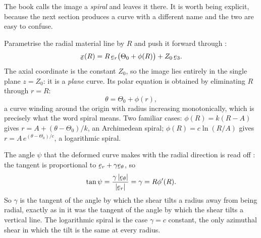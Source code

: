 \begin{remark}\label{rem:spiral}
The book calls the image a \emph{spiral} and leaves it there. It is worth
being explicit, because the next section produces a curve with a different
name and the two are easy to confuse.

Parametrise the radial material line by $R$ and push it forward through
:
\[
   \bx(R)=R\,\ber\big(\Theta_{0}+\phi(R)\big)+Z_{0}\,\be_{3}.
\]
The axial coordinate is the constant $Z_{0}$, so the image lies entirely
in the single plane $z=Z_{0}$: it is a \emph{plane} curve. Its polar
equation is obtained by eliminating $R$ through $r=R$:
\[
   \theta=\Theta_{0}+\phi(r),
\]
a curve winding around the origin with radius increasing monotonically,
which is precisely what the word spiral means. Two familiar cases:
$\phi(R)=k(R-A)$ gives $r=A+(\theta-\Theta_{0})/k$, an Archimedean
spiral; $\phi(R)=c\ln(R/A)$ gives $r=A\,e^{(\theta-\Theta_{0})/c}$, a
logarithmic spiral.

The angle $\psi$ that the deformed curve makes with the radial direction
is read off : the tangent is proportional to $\ber+\gamma\bet$, so
\[
   \tan\psi=\frac{\gamma\,|\bet|}{|\ber|}=\gamma=R\phi'(R).
\]
So $\gamma$ is the tangent of the angle by which the shear tilts a radius
away from being radial, exactly as in  it was the tangent of the
angle by which the shear tilts a vertical line. The logarithmic spiral is
the case $\gamma=c$ constant, the only azimuthal shear in which the tilt
is the same at every radius.
\end{remark}


